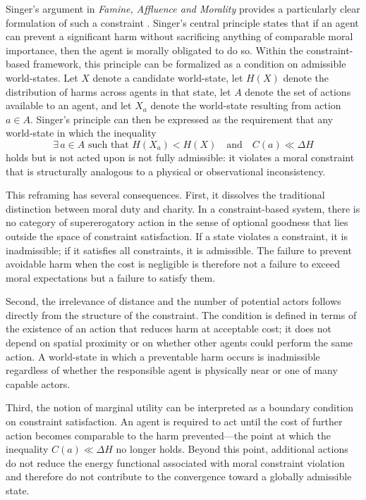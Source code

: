 \documentclass[11pt, oneside]{article}
\begin{document}
Singer's argument in \emph{Famine, Affluence and Morality} provides a particularly clear formulation of such a constraint \cite{singer1972}. Singer's central principle states that if an agent can prevent a significant harm without sacrificing anything of comparable moral importance, then the agent is morally obligated to do so. Within the constraint-based framework, this principle can be formalized as a condition on admissible world-states. Let $X$ denote a candidate world-state, let $H(X)$ denote the distribution of harms across agents in that state, let $A$ denote the set of actions available to an agent, and let $X_a$ denote the world-state resulting from action $a \in A$. Singer's principle can then be expressed as the requirement that any world-state in which the inequality
\[
\exists\, a \in A \text{ such that } H(X_a) < H(X) \quad \text{and} \quad C(a) \ll \Delta H
\]
holds but is not acted upon is not fully admissible: it violates a moral constraint that is structurally analogous to a physical or observational inconsistency.

This reframing has several consequences. First, it dissolves the traditional distinction between moral duty and charity. In a constraint-based system, there is no category of supererogatory action in the sense of optional goodness that lies outside the space of constraint satisfaction. If a state violates a constraint, it is inadmissible; if it satisfies all constraints, it is admissible. The failure to prevent avoidable harm when the cost is negligible is therefore not a failure to exceed moral expectations but a failure to satisfy them.

Second, the irrelevance of distance and the number of potential actors follows directly from the structure of the constraint. The condition is defined in terms of the existence of an action that reduces harm at acceptable cost; it does not depend on spatial proximity or on whether other agents could perform the same action. A world-state in which a preventable harm occurs is inadmissible regardless of whether the responsible agent is physically near or one of many capable actors.

Third, the notion of marginal utility can be interpreted as a boundary condition on constraint satisfaction. An agent is required to act until the cost of further action becomes comparable to the harm prevented---the point at which the inequality $C(a) \ll \Delta H$ no longer holds. Beyond this point, additional actions do not reduce the energy functional associated with moral constraint violation and therefore do not contribute to the convergence toward a globally admissible state.
\end{document}
